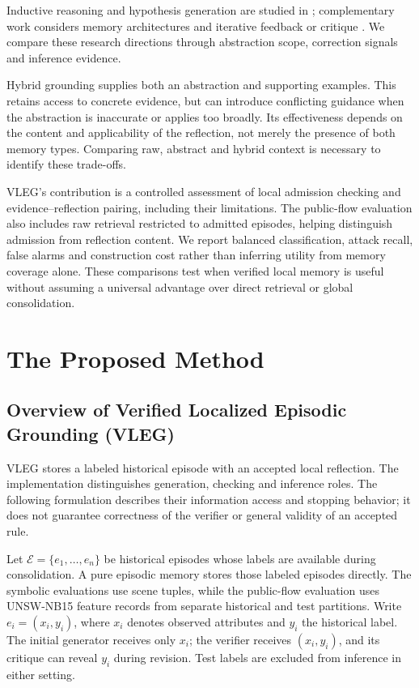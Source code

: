 \documentclass[onecolumn]{IEEEtran}
\numberwithin{equation}{section}
\theoremstyle{definition}
\theoremstyle{remark}
\begin{document}
Inductive reasoning and hypothesis generation are studied in \cite{he2024idea,kim2022playgrounds,lee2024generating,qiu2024phenomenal,zhou2024hypothesis}; complementary work considers memory architectures \cite{kim2023machine,li2024memory,wang2025mirix} and iterative feedback or critique \cite{madaan2023selfrefine,gou2024critic}. We compare these research directions through abstraction scope, correction signals and inference evidence.

Hybrid grounding supplies both an abstraction and supporting examples. This retains access to concrete evidence, but can introduce conflicting guidance when the abstraction is inaccurate or applies too broadly. Its effectiveness depends on the content and applicability of the reflection, not merely the presence of both memory types. Comparing raw, abstract and hybrid context is necessary to identify these trade-offs.

VLEG's contribution is a controlled assessment of local admission checking and evidence--reflection pairing, including their limitations. The public-flow evaluation also includes raw retrieval restricted to admitted episodes, helping distinguish admission from reflection content. We report balanced classification, attack recall, false alarms and construction cost rather than inferring utility from memory coverage alone. These comparisons test when verified local memory is useful without assuming a universal advantage over direct retrieval or global consolidation.

\section{The Proposed Method}
\label{sec:vleg-methodology}

\subsection{Overview of Verified Localized Episodic Grounding (VLEG)}
VLEG stores a labeled historical episode with an accepted local reflection. The implementation distinguishes generation, checking and inference roles. The following formulation describes their information access and stopping behavior; it does not guarantee correctness of the verifier or general validity of an accepted rule.

Let $\mathcal{E}=\{e_1,\ldots,e_n\}$ be historical episodes whose labels are available during consolidation. A pure episodic memory stores those labeled episodes directly. The symbolic evaluations use scene tuples, while the public-flow evaluation uses UNSW-NB15 feature records from separate historical and test partitions. Write $e_i=(x_i,y_i)$, where $x_i$ denotes observed attributes and $y_i$ the historical label. The initial generator receives only $x_i$; the verifier receives $(x_i,y_i)$, and its critique can reveal $y_i$ during revision. Test labels are excluded from inference in either setting.
\end{document}
